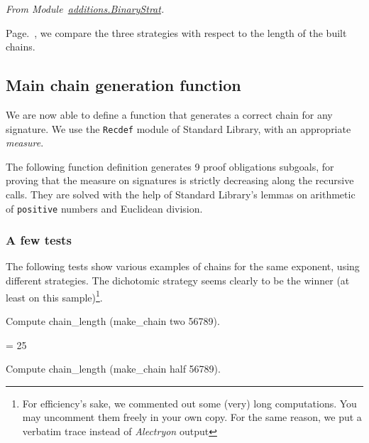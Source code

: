 \emph{From Module~\href{../theories/html/additions.BinaryStrat.html}{additions.BinaryStrat}.}


Page.~\pageref{sect:test-strat}, we compare the three strategies with respect to the length of the built chains.

\subsection{Main chain generation function}
We are now able to define a function that generates a correct chain 
for any signature. We use the \texttt{Recdef} module of Standard Library,
with an appropriate \emph{measure}.




The following function definition generates 9 proof obligations subgoals,
for proving that the measure on signatures is strictly decreasing along
the recursive calls. They are solved with the help of Standard Library's lemmas 
on arithmetic of \texttt{positive} numbers and Euclidean division.

\pagebreak
{}

\subsubsection{A few tests}
\label{sect:test-strat}

The following tests show various examples of chains for the same exponent, using different strategies. The dichotomic strategy seems clearly to be the winner (at least on this sample)\footnote{For efficiency's sake, we commented out some (very) long computations. You may uncomment them freely in your own copy. For the same reason, we put a verbatim trace instead of \textit{Alectryon} output}.

\begin{Coqsrc}
Compute chain_length (make_chain two 56789).
\end{Coqsrc}

\begin{Coqanswer}
= 25%
\end{Coqanswer}

\begin{Coqsrc}
Compute chain_length (make_chain half 56789).
\end{Coqsrc}


